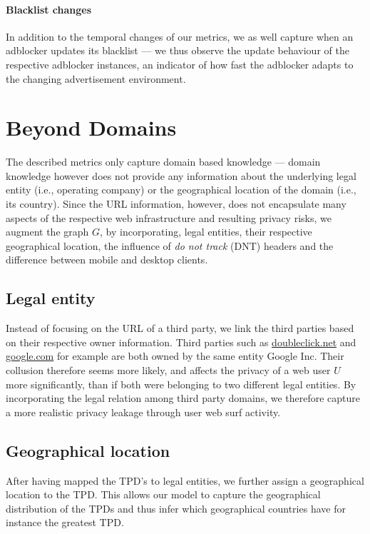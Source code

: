\paragraph{Blacklist changes}
In addition to the temporal changes of our metrics, we as well capture when an adblocker updates its blacklist --- we thus observe the update behaviour of the respective adblocker instances, an indicator of how fast the adblocker adapts to the changing advertisement environment.

\section{Beyond Domains}
The described metrics only capture domain based knowledge --- domain knowledge however does not provide any information about the underlying legal entity (i.e., operating company) or the geographical location of the domain (i.e., its country). Since the URL information, however, does not encapsulate many aspects of the respective web infrastructure and resulting privacy risks, we augment the graph $G$, by incorporating, legal entities, their respective geographical location, the influence of \emph{do not track} (DNT) headers and the difference between mobile and desktop clients.

\subsection{Legal entity}
\label{sec:legal_entity}
Instead of focusing on the URL of a third party, we link the third parties based on their respective owner information. Third parties such as \url{doubleclick.net} and \url{google.com} for example are both owned by the same entity Google Inc. Their collusion therefore seems more likely, and affects the privacy of a web user $U$ more significantly, than if both were belonging to two different legal entities. By incorporating the legal relation among third party domains, we therefore capture a more realistic privacy leakage through user web surf activity.

\subsection{Geographical location}
After having mapped the TPD's to legal entities, we further assign a geographical location to the TPD. This allows our model to capture the geographical distribution of the TPDs and thus infer which geographical countries have for instance the greatest TPD.

